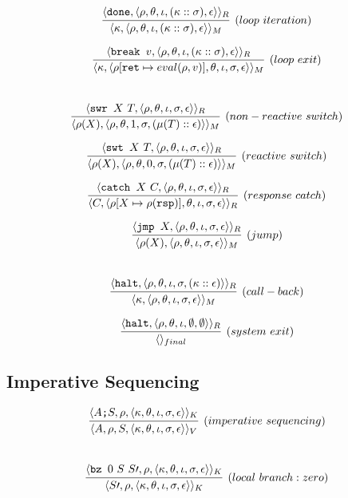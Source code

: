 \documentclass{article}
\newcommand{\state}[1]{\langle #1 \rangle}
\begin{document}
\[
  \infer[(loop\ iteration)]{\state{\kappa, \state{\rho, \theta, \iota, (\kappa :: \sigma), \epsilon}}_M}{\state{\texttt{done}, \state{\rho, \theta, \iota, (\kappa :: \sigma), \epsilon}}_R}
\]

\[
  \infer[(loop\ exit)]{\state{\kappa, \state{\rho[\texttt{ret} \mapsto eval(\rho, v)], \theta, \iota, \sigma, \epsilon}}_M}{\state{\texttt{break }v, \state{\rho, \theta, \iota, (\kappa :: \sigma), \epsilon}}_R}
\]
\\

\[
  \infer[(non-reactive\ switch)]{\state{\rho(X), \state{\rho, \theta, 1, \sigma, (\mu(T) :: \epsilon)}}_M}{\state{\texttt{swr } X\ T, \state{\rho, \theta, \iota, \sigma, \epsilon}}_R}
\]

\[
  \infer[(reactive\ switch)]{\state{\rho(X), \state{\rho, \theta, 0, \sigma, (\mu(T) :: \epsilon)}}_M}{\state{\texttt{swt } X\ T, \state{\rho, \theta, \iota, \sigma, \epsilon}}_R}
\]

\[
  \infer[(response\ catch)]{\state{C, \state{\rho[X \mapsto \rho(\texttt{rsp})], \theta, \iota, \sigma, \epsilon}}_R}{\state{\texttt{catch } X\ C, \state{\rho, \theta, \iota, \sigma, \epsilon}}_R}
\]


\[
  \infer[(jump)]{\state{\rho(X), \state{\rho, \theta, \iota, \sigma, \epsilon}}_M}{\state{\texttt{jmp } X, \state{\rho, \theta, \iota, \sigma, \epsilon}}_R}
\]
\\

\[
  \infer[(call-back)]{\state{\kappa, \state{\rho, \theta, \iota, \sigma, \epsilon}}_M}{\state{\texttt{halt}, \state{\rho, \theta, \iota, \sigma, (\kappa :: \epsilon)}}_R}
\]

\[
  \infer[(system\ exit)]{\state{}_{final}}{\state{\texttt{halt}, \state{\rho, \theta, \iota, \emptyset, \emptyset}}_R}
\]

\subsection{Imperative Sequencing}

\[
  \infer[(imperative\ sequencing)]{\state{A, \rho, S, \state{\kappa, \theta, \iota, \sigma, \epsilon}}_V}{\state{A\texttt{;}S, \rho, \state{\kappa, \theta, \iota, \sigma, \epsilon}}_K}
\]
\\

\[
  \infer[(local\ branch: zero)]{\state{S\prime, \rho, \state{\kappa, \theta, \iota, \sigma, \epsilon}}_K}{\state{\texttt{bz }0\ S\ S\prime, \rho, \state{\kappa, \theta, \iota, \sigma, \epsilon}}_K}
\]
\\
\end{document}
